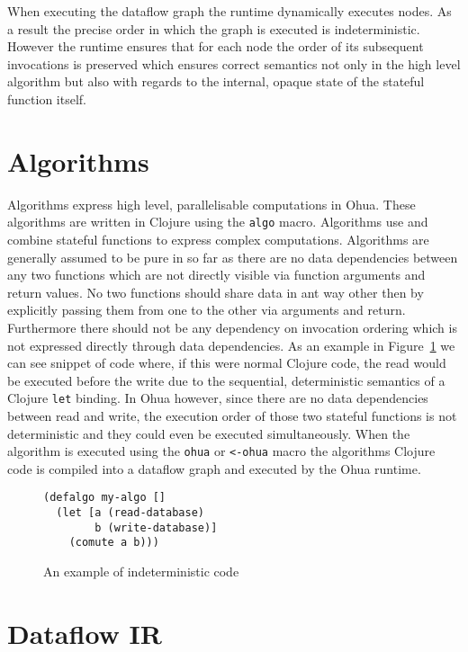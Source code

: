 When executing the dataflow graph the runtime dynamically executes nodes.
As a result the precise order in which the graph is executed is indeterministic.
However the runtime ensures that for each node the order of its subsequent invocations is preserved which ensures correct semantics not only in the high level algorithm but also with regards to the internal, opaque state of the stateful function itself.

\section{Algorithms}

Algorithms express high level, parallelisable computations in Ohua.
These algorithms are written in Clojure using the \texttt{algo} macro.
Algorithms use and combine stateful functions to express complex computations.
Algorithms are generally assumed to be pure in so far as there are no data dependencies between any two functions which are not directly visible via function arguments and return values.
No two functions should share data in ant way other then by explicitly passing them from one to the other via arguments and return.
Furthermore there should not be any dependency on invocation ordering which is not expressed directly through data dependencies.
As an example in Figure~\ref{fig:indeterministic-code} we can see  snippet of code where, if this were normal Clojure code, the read would be executed before the write due to the sequential, deterministic semantics of a Clojure \texttt{let} binding.
In Ohua however, since there are no data dependencies between read and write, the execution order of those two stateful functions is not deterministic and they could even be executed simultaneously.
When the algorithm is executed using the \texttt{ohua} or \texttt{<-ohua} macro the algorithms Clojure code is compiled into a dataflow graph and executed by the Ohua runtime.

\begin{figure}
\begin{verbatim}
(defalgo my-algo []
  (let [a (read-database)
        b (write-database)]
    (comute a b)))
\end{verbatim}
\caption{An example of indeterministic code}
\label{fig:indeterministic-code}
\end{figure}

\section{Dataflow IR}

